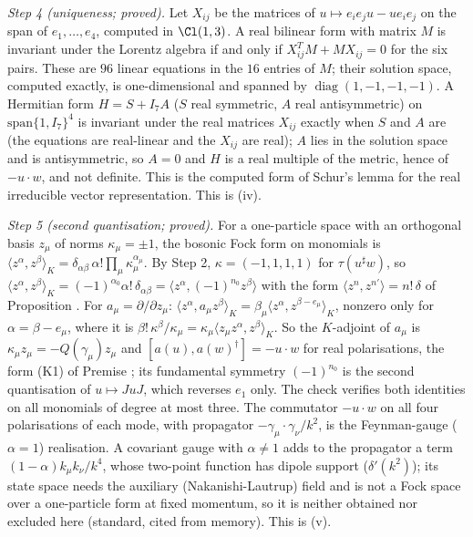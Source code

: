 \emph{Step 4 (uniqueness; proved).} Let $X_{ij}$ be the matrices of $u \mapsto e_{i}e_{j}u - ue_{i}e_{j}$ on the span of $e_{1}, \dots, e_{4}$, computed in $\Cl(1,3)$. A real bilinear form with matrix $M$ is invariant under the Lorentz algebra if and only if $X_{ij}^{T}M + MX_{ij} = 0$ for the six pairs. These are $96$ linear equations in the $16$ entries of $M$; their solution space, computed exactly, is one-dimensional and spanned by $\operatorname{diag}(1, -1, -1, -1)$. A Hermitian form $H = S + I_{7}A$ ($S$ real symmetric, $A$ real antisymmetric) on $\mathrm{span}\{1, I_{7}\}^{4}$ is invariant under the real matrices $X_{ij}$ exactly when $S$ and $A$ are (the equations are real-linear and the $X_{ij}$ are real); $A$ lies in the solution space and is antisymmetric, so $A = 0$ and $H$ is a real multiple of the metric, hence of $-u\cdot w$, and not definite. This is the computed form of Schur's lemma for the real irreducible vector representation. This is (iv).

\emph{Step 5 (second quantisation; proved).} For a one-particle space with an orthogonal basis $z_{\mu}$ of norms $\kappa_{\mu} = \pm1$, the bosonic Fock form on monomials is $\langle z^{\alpha}, z^{\beta}\rangle_{K} = \delta_{\alpha\beta}\,\alpha!\prod_{\mu}\kappa_{\mu}^{\alpha_{\mu}}$. By Step 2, $\kappa = (-1, 1, 1, 1)$ for $\tau(u^{\sharp}w)$, so $\langle z^{\alpha}, z^{\beta}\rangle_{K} = (-1)^{\alpha_{0}}\alpha!\,\delta_{\alpha\beta} = \langle z^{\alpha}, (-1)^{n_{0}}z^{\beta}\rangle$ with the form $\langle z^{n}, z^{n'}\rangle = n!\,\delta$ of Proposition . For $a_{\mu} = \partial/\partial z_{\mu}$: $\langle z^{\alpha}, a_{\mu}z^{\beta}\rangle_{K} = \beta_{\mu}\langle z^{\alpha}, z^{\beta - e_{\mu}}\rangle_{K}$, nonzero only for $\alpha = \beta - e_{\mu}$, where it is $\beta!\,\kappa^{\beta}/\kappa_{\mu} = \kappa_{\mu}\langle z_{\mu}z^{\alpha}, z^{\beta}\rangle_{K}$. So the $K$-adjoint of $a_{\mu}$ is $\kappa_{\mu}z_{\mu} = -Q(\gamma_{\mu})z_{\mu}$ and $[a(u), a(w)^{\dagger}] = -u\cdot w$ for real polarisations, the form (K1) of Premise ; its fundamental symmetry $(-1)^{n_{0}}$ is the second quantisation of $u \mapsto JuJ$, which reverses $e_{1}$ only. The check verifies both identities on all monomials of degree at most three. The commutator $-u\cdot w$ on all four polarisations of each mode, with propagator $-\gamma_{\mu}\cdot\gamma_{\nu}/k^{2}$, is the Feynman-gauge ($\alpha = 1$) realisation. A covariant gauge with $\alpha \neq 1$ adds to the propagator a term $(1 - \alpha)k_{\mu}k_{\nu}/k^{4}$, whose two-point function has dipole support ($\delta'(k^{2})$); its state space needs the auxiliary (Nakanishi-Lautrup) field and is not a Fock space over a one-particle form at fixed momentum, so it is neither obtained nor excluded here (standard, cited from memory). This is (v).

